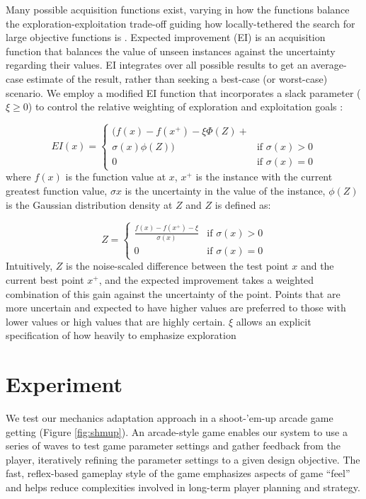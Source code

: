 \documentclass[letterpaper]{article}
\begin{document}
Many possible acquisition functions exist, varying in how the functions balance the exploration-exploitation trade-off guiding how locally-tethered the search for large objective functions is \cite{settles2012:al-book}. Expected improvement (EI) is an acquisition function that balances the value of unseen instances against the uncertainty regarding their values. EI integrates over all possible results to get an average-case estimate of the result, rather than seeking a best-case (or worst-case) scenario. We employ a modified EI function that incorporates a slack parameter ($\xi \ge 0$) to control the relative weighting of exploration and exploitation goals \cite{lizotte2008}:


$$ EI(x) = \begin{cases} 
(f(x) - f(x^{+}) - \xi \Phi(Z) + \\ \sigma(x) \phi(Z)) & \mbox{if } \sigma(x) > 0 \\ 
0 & \mbox{if } \sigma(x) = 0 
\end{cases} $$
where $f(x)$ is the function value at $x$, $x^{+}$ is the instance with the current greatest function value, $\sigma{x}$ is the uncertainty in the value of the instance, $\phi(Z)$ is the Gaussian distribution density at $Z$ and $Z$ is defined as:

$$ Z = \begin{cases} 
\frac{f(x) - f(x^{+}) - \xi}{\sigma(x)} & \mbox{if } \sigma(x) > 0 \\ 
0 & \mbox{if } \sigma(x) = 0 
\end{cases} $$
Intuitively, $Z$ is the noise-scaled difference between the test point $x$ and the current best point $x^{+}$, and the expected improvement takes a weighted combination of this gain against the uncertainty of the point. Points that are more uncertain and expected to have higher values are preferred to those with lower values or high values that are highly certain. $\xi$ allows an explicit specification of how heavily to emphasize exploration



\section{Experiment}
We test our mechanics adaptation approach in a shoot-'em-up arcade game getting (Figure \ref{fig:shmup}). An arcade-style game enables our system to use a series of waves to test game parameter settings and gather feedback from the player, iteratively refining the parameter settings to a given design objective. The fast, reflex-based gameplay style of the game emphasizes aspects of game ``feel'' and helps reduce complexities involved in long-term player planning and strategy.
\end{document}
